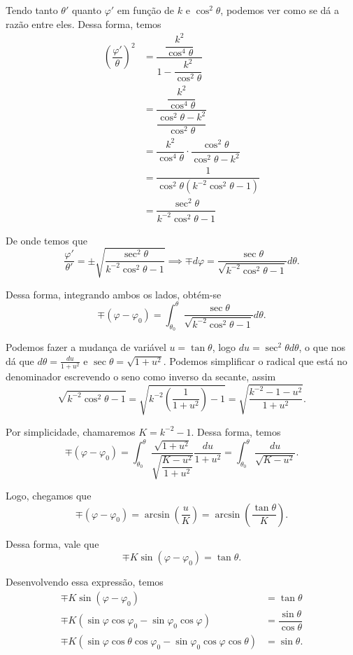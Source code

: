 \documentclass{article}
\begin{document}
Tendo tanto $\theta'$ quanto $\varphi'$ em função de $k$ e $\cos^2{\theta}$, podemos ver como se dá a razão entre eles. Dessa forma, temos
\begin{align*}
    \left(\dfrac{\varphi'}{\theta}\right)^2 & = \dfrac{\dfrac{k^2}{\cos^4{\theta}}}{1 - \dfrac{k^2}{\cos^2{\theta}}} \\
    & = \dfrac{\dfrac{k^2}{\cos^4{\theta}}}{\dfrac{\cos^2{\theta} - k^2}{\cos^2{\theta}}} \\
    & = \dfrac{k^2}{\cos^4{\theta}}\cdot \dfrac{\cos^2{\theta}}{\cos^2{\theta} - k^2} \\
    & = \dfrac{1}{\cos^2{\theta}\left(k^{-2}\cos^2{\theta} - 1\right)} \\
    & = \dfrac{\sec^2{\theta}}{k^{-2}\cos^2{\theta} - 1}
\end{align*}

De onde temos que
\[\dfrac{\varphi'}{\theta'} = \pm \sqrt{\dfrac{\sec^2{\theta}}{k^{-2}\cos^2{\theta} - 1}}\implies \mp d\varphi = \dfrac{\sec{\theta}}{\sqrt{k^{-2}\cos^2{\theta} - 1}} d\theta.\]

Dessa forma, integrando ambos os lados, obtém-se
\[\mp (\varphi - \varphi_0) = \int_{\theta_0}^\theta \dfrac{\sec{\theta}}{\sqrt{k^{-2}\cos^2{\theta} - 1}} d\theta.\]

Podemos fazer a mudança de variável $u = \tan{\theta}$, logo $du = \sec^2{\theta} d\theta$, o que nos dá que $d\theta = \frac{du}{1 + u^2}$ e $\sec{\theta} = \sqrt{1 + u^2}$. Podemos simplificar o radical que está no denominador escrevendo o seno como inverso da secante, assim
\[\sqrt{k^{-2}\cos^2{\theta} - 1} = \sqrt{k^{-2}\left(\dfrac{1}{1 + u^2}\right) - 1} = \sqrt{\dfrac{k^{-2} - 1 - u^2}{1 + u^2}}.\]

Por simplicidade, chamaremos $K = k^{-2} - 1$. Dessa forma, temos
\[\mp (\varphi - \varphi_0) = \int_{\theta_0}^\theta \dfrac{\sqrt{1 + u^2}}{\sqrt{\dfrac{K - u^2}{1 + u^2}}} \dfrac{du}{1 + u^2} = \int_{\theta_0}^\theta \dfrac{du}{\sqrt{K - u^2}}.\]

Logo, chegamos que
\[\mp (\varphi - \varphi_0) = \arcsin{\left(\dfrac{u}{K}\right)} = \arcsin{\left(\dfrac{\tan{\theta}}{K}\right)}.\]

Dessa forma, vale que
\[\mp K\sin{(\varphi - \varphi_0)} = \tan{\theta}.\]

Desenvolvendo essa expressão, temos
\begin{align*}
    \mp K\sin{(\varphi - \varphi_0)} & = \tan{\theta} \\
    \mp K\left(\sin{\varphi}\cos{\varphi_0} - \sin{\varphi_0}\cos{\varphi}\right) & = \dfrac{\sin{\theta}}{\cos{\theta}} \\
    \mp K\left(\sin{\varphi}\cos{\theta}\cos{\varphi_0} - \sin{\varphi_0}\cos{\varphi}\cos{\theta}\right) & = \sin{\theta}.
\end{align*}
\end{document}
